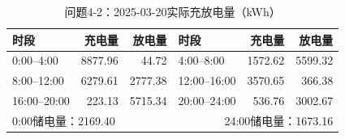 \begin{table}[H]\centering\small
\caption{问题4-2：2025-03-20实际充放电量（kWh）}
\label{tab:q4_2_0320_storage}
\begin{tabular}{lrrlrr}\toprule
时段 & 充电量 & 放电量 & 时段 & 充电量 & 放电量\\\midrule
0:00--4:00 & 8877.96 & 44.72 & 4:00--8:00 & 1572.62 & 5599.32 \\
8:00--12:00 & 6279.61 & 2777.38 & 12:00--16:00 & 3570.65 & 366.38 \\
16:00--20:00 & 223.13 & 5715.34 & 20:00--24:00 & 536.76 & 3002.67 \\
\midrule\multicolumn{3}{l}{0:00储电量：2169.40} & \multicolumn{3}{r}{24:00储电量：1673.16}\\
\bottomrule\end{tabular}\end{table}
